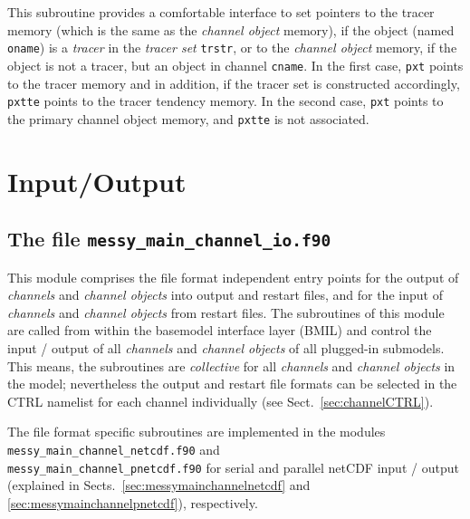 \documentclass[twoside]{article}
\begin{document}
This subroutine provides a comfortable interface to set pointers to the tracer
memory (which is the same as the {\it channel object} memory),
if the object (named {\tt oname}) is a {\it tracer} in the {\it tracer set}
{\tt trstr}, or to the {\it channel object} memory,
if the object is not a tracer, but an object in channel {\tt cname}.
In the first case, {\tt pxt} points to the tracer memory and in addition,
if the tracer set is constructed accordingly,
{\tt pxtte} points to the tracer tendency memory.
In the second case, {\tt pxt} points to the primary channel object memory,
and {\tt pxtte} is not associated.


\section{Input/Output}
\label{sec:io}

\subsection{The file {\tt messy\_main\_channel\_io.f90}}
\label{sec:messymainchannelio}

This module comprises the file format independent entry points for the output
of {\it channels} and {\it channel objects} into output and restart files,
and for the input of {\it channels} and {\it channel objects} from restart
files.
The subroutines of this module are called from within the basemodel interface
layer (BMIL) and control the input / output of all
{\it channels} and {\it channel objects} of all plugged-in submodels.
This means, the subroutines are {\it collective} for all
{\it channels} and {\it channel objects} in the model; nevertheless
the output and restart file formats can be selected
in the CTRL namelist for each channel individually
(see Sect.~\ref{sec:channelCTRL}).

The file format specific subroutines are implemented in the modules
{\tt messy\_main\_channel\_netcdf.f90} and\\
{\tt messy\_main\_channel\_pnetcdf.f90} for serial and parallel netCDF input /
output (explained in Sects.~\ref{sec:messymainchannelnetcdf} and
\ref{sec:messymainchannelpnetcdf}), respectively.
\end{document}

